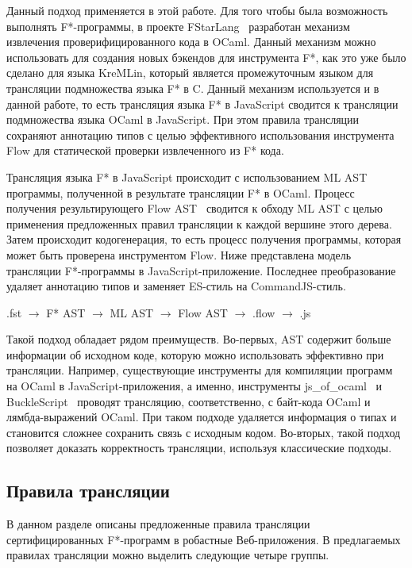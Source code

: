 \documentclass[12pt]{matmex-diploma}
\begin{document}
Данный подход применяется в этой работе. Для того чтобы была возможность выполнять F*-программы, в проекте FStarLang~\cite{fstargh} разработан механизм извлечения проверифицированного кода в OCaml. Данный механизм можно использовать для создания новых бэкендов для инструмента F*, как это уже было сделано для языка KreMLin, который является промежуточным языком для трансляции подмножества языка F* в C. Данный механизм используется и в данной работе, то есть трансляция языка F* в JavaScript сводится к трансляции подмножества языка OCaml в JavaScript. При этом правила трансляции сохраняют аннотацию типов с целью эффективного использования инструмента Flow для статической проверки извлеченного из F* кода.

Трансляция языка F* в JavaScript происходит с использованием ML AST программы, полученной в результате трансляции F* в OCaml. Процесс получения результирующего Flow AST~\cite{flow_ast} сводится к обходу ML AST с целью применения предложенных правил трансляции к каждой вершине этого дерева. Затем происходит кодогенерация, то есть процесс получения программы, которая может быть проверена инструментом Flow. Ниже представлена модель трансляции F*-программы в JavaScript-приложение. Последнее преобразование удаляет аннотацию типов и заменяет ES-стиль на CommandJS-стиль.

\begin{center}
.fst $\to$ F* AST $\to$  ML AST $\to$ Flow AST $\to$ .flow $\to$  .js
\end{center}

Такой подход обладает рядом преимуществ. Во-первых, AST содержит больше информации об исходном коде, которую можно использовать эффективно при трансляции. Например, существующие инструменты для компиляции программ на OCaml в JavaScript-приложения, а именно, инструменты js\_of\_ocaml~\cite{ocamljs} и BuckleScript~\cite{bucklescript} проводят трансляцию, соответственно, с байт-кода OCaml и лямбда-выражений OCaml. При таком подходе удаляется информация о типах и становится сложнее сохранить связь с исходным кодом. Во-вторых, такой подход позволяет доказать корректность трансляции, используя классические подходы. 

\subsection{Правила трансляции}

В данном разделе описаны предложенные правила трансляции сертифицированных F*-программ в робастные Веб-приложения. В предлагаемых правилах трансляции можно выделить следующие четыре группы.
\end{document}
